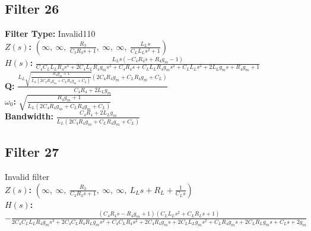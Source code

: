 \documentclass{article}
\begin{document}
\subsection*{Filter 26}
\textbf{Filter Type:} Invalid110 \\ 
\textbf{$Z(s)$:} $\left( \infty, \  \infty, \  \frac{R_{3}}{C_{3} R_{3} s + 1}, \  \infty, \  \infty, \  \frac{L_{L} s}{C_{L} L_{L} s^{2} + 1}\right)$ \\ 
\textbf{$H(s)$:} $\frac{L_{L} s \left(- C_{4} R_{4} s + R_{4} g_{m} - 1\right)}{C_{4} C_{L} L_{L} R_{4} s^{3} + 2 C_{4} L_{L} R_{4} g_{m} s^{2} + C_{4} R_{4} s + C_{L} L_{L} R_{4} g_{m} s^{2} + C_{L} L_{L} s^{2} + 2 L_{L} g_{m} s + R_{4} g_{m} + 1}$ \\ 
\textbf{Q:} $\frac{L_{L} \sqrt{\frac{R_{4} g_{m} + 1}{L_{L} \left(2 C_{4} R_{4} g_{m} + C_{L} R_{4} g_{m} + C_{L}\right)}} \left(2 C_{4} R_{4} g_{m} + C_{L} R_{4} g_{m} + C_{L}\right)}{C_{4} R_{4} + 2 L_{L} g_{m}}$ \\ 
\textbf{$\omega_0$:} $\sqrt{\frac{R_{4} g_{m} + 1}{L_{L} \left(2 C_{4} R_{4} g_{m} + C_{L} R_{4} g_{m} + C_{L}\right)}}$ \\ 
\textbf{Bandwidth:} $\frac{C_{4} R_{4} + 2 L_{L} g_{m}}{L_{L} \left(2 C_{4} R_{4} g_{m} + C_{L} R_{4} g_{m} + C_{L}\right)}$ \\ 
\subsection*{Filter 27}
Invalid filter \\ 
\textbf{$Z(s)$:} $\left( \infty, \  \infty, \  \frac{R_{3}}{C_{3} R_{3} s + 1}, \  \infty, \  \infty, \  L_{L} s + R_{L} + \frac{1}{C_{L} s}\right)$ \\ 
\textbf{$H(s)$:} $- \frac{\left(C_{4} R_{4} s - R_{4} g_{m} + 1\right) \left(C_{L} L_{L} s^{2} + C_{L} R_{L} s + 1\right)}{2 C_{4} C_{L} L_{L} R_{4} g_{m} s^{3} + 2 C_{4} C_{L} R_{4} R_{L} g_{m} s^{2} + C_{4} C_{L} R_{4} s^{2} + 2 C_{4} R_{4} g_{m} s + 2 C_{L} L_{L} g_{m} s^{2} + C_{L} R_{4} g_{m} s + 2 C_{L} R_{L} g_{m} s + C_{L} s + 2 g_{m}}$ \\ 
\end{document}
